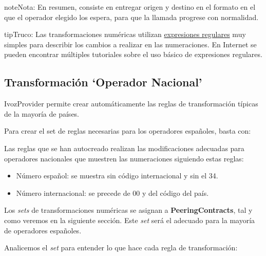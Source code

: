 \documentclass[letterpaper,10pt,spanish]{sphinxmanual}
\begin{document}
\begin{notice}{note}{Nota:}
En resumen, consiste en entregar origen y destino en el formato en el que el operador elegido los espera, para que la llamada progrese con normalidad.
\end{notice}

\begin{notice}{tip}{Truco:}
Las transformaciones numéricas utilizan \href{https://es.wikipedia.org/wiki/Expresi\%C3\%B3n\_regular}{expresiones regulares} muy simples para describir los cambios a realizar en las numeraciones. En Internet se pueden encontrar múltiples tutoriales sobre el uso básico de expresiones regulares.
\end{notice}


\subsection{Transformación `Operador Nacional'}
\label{external_incoming_calls/numeric_transformations:transformacion-operador-nacional}
IvozProvider permite crear automáticamente las reglas de transformación típicas de la mayoría de países.

Para crear el set de reglas necesarias para los operadores españoles, basta con:


Las reglas que se han autocreado realizan las modificaciones adecuadas para operadores nacionales que muestren las numeraciones siguiendo estas reglas:
\begin{itemize}
\item {} 
Número español: se muestra sin código internacional y sin el 34.

\item {} 
Número internacional: se precede de 00 y del código del país.

\end{itemize}

Los \emph{sets} de transformaciones numéricas se asignan a \textbf{PeeringContracts}, tal y como veremos en la siguiente sección. Este \emph{set} será el adecuado para la mayoría de operadores españoles.

Analicemos el \emph{set} para entender lo que hace cada regla de transformación:

\noindent{}
\end{document}
